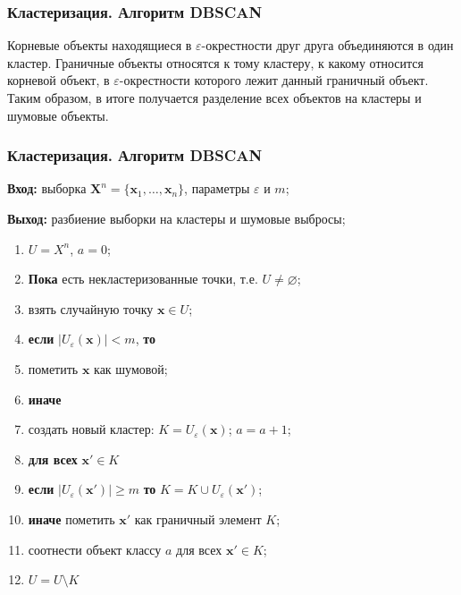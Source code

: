 \documentclass[ucs, notheorems, handout]{beamer}
\begin{document}
	\begin{frame}
	\frametitle{Кластеризация. Алгоритм DBSCAN}
	

	Корневые объекты находящиеся в $\varepsilon$-окрестности друг друга объединяются в один кластер. Граничные объекты относятся к тому кластеру, к какому относится корневой
	объект, в $\varepsilon$-окрестности которого лежит данный граничный объект. Таким образом, в итоге получается разделение всех объектов на кластеры и шумовые объекты.

	\end{frame}
	
	\begin{frame}
	\frametitle{Кластеризация. Алгоритм DBSCAN}
	

	\textbf{Вход:} выборка $\pmb X^{n} = \{\pmb x_1, \dots, \pmb x_{n}\}$, параметры $\varepsilon$ и $m$;
	
\textbf{Выход:} разбиение выборки на кластеры и шумовые выбросы;
\begin{enumerate}
		\item $U=X^n$, $a=0$; 
		\item \textbf{Пока} есть некластеризованные точки, т.е. $U \neq \varnothing$; 
		\item \quad взять случайную точку $\pmb x \in U$; 
		\item \quad \textbf{если} $|U_\varepsilon (\pmb x)| < m$, \textbf{то} 
		\item \quad \quad пометить $\pmb x$ как шумовой; 
		\item \quad \textbf{иначе} 
		\item \quad \quad создать новый кластер: $K=U_\varepsilon (\pmb x)$; $a = a + 1$; 
		\item \quad \quad \textbf{для всех} $\pmb x' \in K$ 
		\item \quad \quad \quad \textbf{если} $|U_\varepsilon (\pmb x')| \geq m$ \textbf{то} $K=K \cup U_\varepsilon(\pmb x')$; 
		\item \quad \quad \quad \textbf{иначе} пометить $\pmb x'$ как граничный элемент $K$; 
		\item \quad \quad соотнести объект классу $a$ для всех $\pmb x' \in K$; 
		\item \quad \quad $U=U \setminus K$ 
\end{enumerate}

	\end{frame}
	
\end{document}
